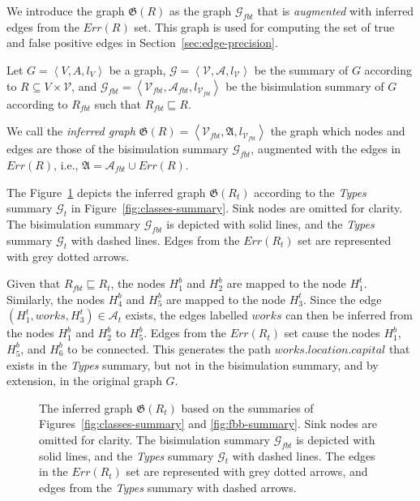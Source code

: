 We introduce the graph $\mathfrak{G}(R)$ as the graph $\mathcal{G}_{fbt}$ that is \emph{augmented} with inferred edges from the $Err(R)$ set. This graph is used for computing the set of true and false positive edges in Section~\ref{sec:edge-precision}.

\begin{definition}
Let $G=\left\langle V, A, l_V \right\rangle$ be a graph, $\mathcal{G} = \left\langle \mathcal{V}, \mathcal{A}, l_{\mathcal{V}} \right\rangle$ be the summary of $G$ according to $R \subseteq V \times \mathcal{V}$, and $\mathcal{G}_{fbt} = \left\langle \mathcal{V}_{fbt}, \mathcal{A}_{fbt}, l_{\mathcal{V}_{fbt}} \right\rangle$ be the bisimulation summary of $G$ according to $R_{fbt}$ such that $R_{fbt} \sqsubseteq R$.

We call the \emph{inferred graph} $\mathfrak{G}(R) = \left\langle \mathcal{V}_{fbt}, \mathfrak{A}, l_{\mathcal{V}_{fbt}} \right\rangle$ the graph which nodes and edges are those of the bisimulation summary $\mathcal{G}_{fbt}$, augmented with the edges in $Err(R)$, i.e., $\mathfrak{A} = \mathcal{A}_{fbt} \cup Err(R)$.
\end{definition}

The Figure~\ref{fig:accuracy} depicts the inferred graph $\mathfrak{G}(R_t)$ according to the \emph{Types} summary $\mathcal{G}_t$ in Figure~\ref{fig:classes-summary}.
Sink nodes are omitted for clarity. The bisimulation summary $\mathcal{G}_{fbt}$ is depicted with solid lines, and the \emph{Types} summary $\mathcal{G}_t$ with dashed lines. Edges from the $Err(R_t)$ set are represented with grey dotted arrows.

Given that $R_{fbt} \sqsubseteq R_t$, the nodes $H^b_1$ and $H^b_2$ are mapped to the node $H^t_1$. Similarly, the nodes $H^b_4$ and $H^b_5$ are mapped to the node $H^t_3$. Since the edge $(H^t_1, works, H^t_3) \in \mathcal{A}_t$ exists, the edges labelled $works$ can then be inferred from the nodes $H^b_1$ and $H^b_2$ to $H^b_5$. Edges from the $Err(R_t)$ set cause the nodes $H^b_1$, $H^b_5$, and $H^b_6$ to be connected. This generates the path $works.location.capital$ that exists in the \emph{Types} summary, but not in the bisimulation summary, and by extension, in the original graph $G$.

\begin{figure}
	\centering
	\resizebox{\textwidth}{!}{
		
	}
	\caption{The inferred graph $\mathfrak{G}(R_t)$ based on the summaries of Figures~\ref{fig:classes-summary} and \ref{fig:fbb-summary}.
	Sink nodes are omitted for clarity. The bisimulation summary $\mathcal{G}_{fbt}$ is depicted with solid lines, and the \emph{Types} summary $\mathcal{G}_t$ with dashed lines. The edges in the $Err(R_t)$ set are represented with grey dotted arrows, and edges from the \emph{Types} summary with dashed arrows.}
	\label{fig:accuracy}
\end{figure}

